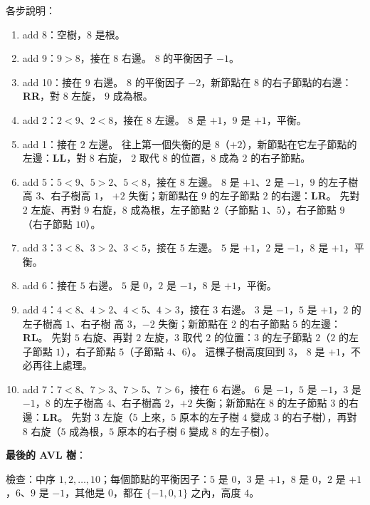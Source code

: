 \begin{pastsoln}
各步說明：
\begin{enumerate}
\item add 8：空樹，$8$ 是根。
\item add 9：$9 > 8$，接在 $8$ 右邊。 $8$ 的平衡因子 $-1$。
\item add 10：接在 $9$ 右邊。 $8$ 的平衡因子 $-2$，新節點在 $8$ 的右子節點的右邊：\textbf{RR}，對 $8$ 左旋，
$9$ 成為根。
\item add 2：$2 < 9$、$2 < 8$，接在 $8$ 左邊。 $8$ 是 $+1$，$9$ 是 $+1$，平衡。
\item add 1：接在 $2$ 左邊。 往上第一個失衡的是 $8$（$+2$），新節點在它左子節點的左邊：\textbf{LL}，對 $8$ 右旋，
$2$ 取代 $8$ 的位置，$8$ 成為 $2$ 的右子節點。
\item add 5：$5 < 9$、$5 > 2$、$5 < 8$，接在 $8$ 左邊。 $8$ 是 $+1$、$2$ 是 $-1$，$9$ 的左子樹高 $3$、右子樹高 $1$，
$+2$ 失衡；新節點在 $9$ 的左子節點 $2$ 的右邊：\textbf{LR}。 先對 $2$ 左旋、再對 $9$ 右旋，$8$ 成為根，左子節點
$2$（子節點 $1$、$5$），右子節點 $9$（右子節點 $10$）。
\item add 3：$3 < 8$、$3 > 2$、$3 < 5$，接在 $5$ 左邊。 $5$ 是 $+1$，$2$ 是 $-1$，$8$ 是 $+1$，平衡。
\item add 6：接在 $5$ 右邊。 $5$ 是 $0$，$2$ 是 $-1$，$8$ 是 $+1$，平衡。
\item add 4：$4 < 8$、$4 > 2$、$4 < 5$、$4 > 3$，接在 $3$ 右邊。 $3$ 是 $-1$，$5$ 是 $+1$，$2$ 的左子樹高 $1$、右子樹
高 $3$，$-2$ 失衡；新節點在 $2$ 的右子節點 $5$ 的左邊：\textbf{RL}。 先對 $5$ 右旋、再對 $2$ 左旋，$3$ 取代 $2$
的位置：$3$ 的左子節點 $2$（$2$ 的左子節點 $1$），右子節點 $5$（子節點 $4$、$6$）。 這棵子樹高度回到 $3$，
$8$ 是 $+1$，不必再往上處理。
\item add 7：$7 < 8$、$7 > 3$、$7 > 5$、$7 > 6$，接在 $6$ 右邊。 $6$ 是 $-1$，$5$ 是 $-1$，$3$ 是 $-1$，$8$ 的左子樹高
$4$、右子樹高 $2$，$+2$ 失衡；新節點在 $8$ 的左子節點 $3$ 的右邊：\textbf{LR}。 先對 $3$ 左旋（$5$ 上來，$5$
原本的左子樹 $4$ 變成 $3$ 的右子樹），再對 $8$ 右旋（$5$ 成為根，$5$ 原本的右子樹 $6$ 變成 $8$ 的左子樹）。
\end{enumerate}

\textbf{最後的 AVL 樹}：
\begin{center}
\end{center}
檢查：中序 $1, 2, \ldots, 10$；每個節點的平衡因子：$5$ 是 $0$，$3$ 是 $+1$，$8$ 是 $0$，$2$ 是 $+1$，$6$、$9$ 是
$-1$，其他是 $0$，都在 $\{-1, 0, 1\}$ 之內，高度 $4$。
\end{pastsoln}
